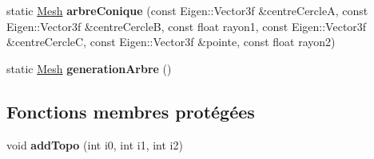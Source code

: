 \begin{DoxyCompactItemize}
\item 
\hypertarget{class_mesh_a5006a9bdbbb9e7675b2f309ef5c23ab2}{}static \hyperlink{class_mesh}{Mesh} {\bfseries arbre\+Conique} (const Eigen\+::\+Vector3f \&centre\+Cercle\+A, const Eigen\+::\+Vector3f \&centre\+Cercle\+B, const float rayon1, const Eigen\+::\+Vector3f \&centre\+Cercle\+C, const Eigen\+::\+Vector3f \&pointe, const float rayon2)\label{class_mesh_a5006a9bdbbb9e7675b2f309ef5c23ab2}

\item 
\hypertarget{class_mesh_a9f879433df5f8264105d832f37d47e9f}{}static \hyperlink{class_mesh}{Mesh} {\bfseries generation\+Arbre} ()\label{class_mesh_a9f879433df5f8264105d832f37d47e9f}

\end{DoxyCompactItemize}
\subsection*{Fonctions membres protégées}
\begin{DoxyCompactItemize}
\item 
\hypertarget{class_mesh_aa671274e8450902dd8f08f6efae18589}{}void {\bfseries add\+Topo} (int i0, int i1, int i2)\label{class_mesh_aa671274e8450902dd8f08f6efae18589}

\end{DoxyCompactItemize}
